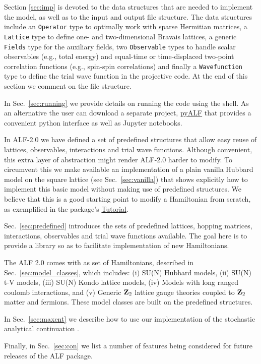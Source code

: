 Section \ref{sec:imp} is devoted to the data structures that are needed to implement the model, as well as to the input and output file structure.   
The data structures include an \texttt{Operator} type to optimally work with sparse Hermitian matrices,
a \texttt{Lattice} type  to define one- and two-dimensional Bravais lattices,
a generic \texttt{Fields} type for the auxiliary fields,
two \texttt{Observable} types to handle scalar observables (e.g., total energy) and equal-time or time-displaced two-point correlation functions (e.g., spin-spin correlations) and finally a \texttt{Wavefunction} type  to define the trial wave function in the projective code.
At the end of this section we comment on the file structure.

In Sec.~\ref{sec:running}   we provide details on running the code  using the shell.  As an alternative the user can download a separate project, \href{https://git.physik.uni-wuerzburg.de/ALF/pyALF}{pyALF}   that provides a convenient python interface as well as  Jupyter  notebooks. 

In ALF-2.0  we have defined a set of predefined structures that allow easy reuse of lattices, observables, interactions and trial wave functions.   Although convenient, this extra layer of abstraction might 
render ALF-2.0  harder to modify. To circumvent this we make available an implementation of a plain vanilla Hubbard model on the square lattice (see Sec.~\ref{sec:vanilla}) that shows explicitly how to implement this basic model without making use of predefined structures.  We believe that this is a good starting point to modify a Hamiltonian from scratch, as exemplified in the package's \href{https://git.physik.uni-wuerzburg.de/ALF/ALF_Tutorial}{Tutorial}. 

Sec.~\ref{sec:predefined}   introduces the sets of predefined lattices,  hopping matrices,  interactions, observables and trial wave functions available.  The goal here is to provide a 
library  so as to facilitate  implementation of new  Hamiltonians. 

The ALF 2.0  comes with as set of Hamiltonians, described in Sec.~\ref{sec:model_classes}, which includes: (i) SU(N) Hubbard models, (ii) SU(N) t-V models, (iii) SU(N) Kondo lattice models, (iv)    Models with long ranged coulomb interactions, and (v) Generic $\mathbf{Z}_{2}$ lattice gauge theories coupled to $\mathbf{Z}_{2}$ matter and fermions.  These model classes are built on the predefined structures. 

In Sec.~\ref{sec:maxent}  we  describe how to use our implementation of the stochastic analytical  continuation \cite{Sandvik98,Beach04a}.

Finally, in Sec.~\ref{sec:con} we list a number of features being considered for  future releases of the ALF package.
